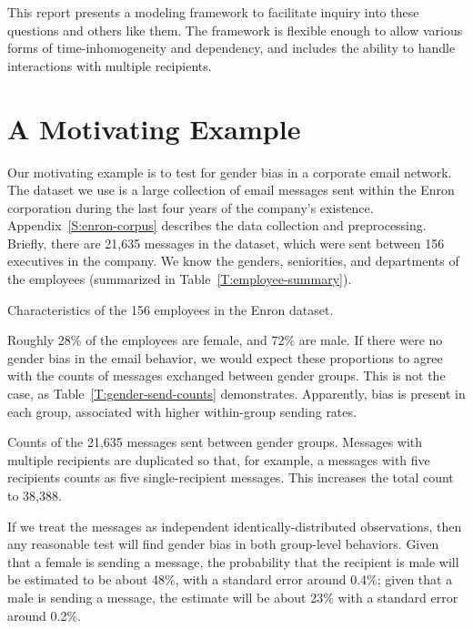 \documentclass[aoas,preprint]{imsart}
\begin{document}
This report presents a modeling framework to facilitate inquiry into
these questions and others like them. The framework is flexible enough to
allow various forms of time-inhomogeneity and dependency, and includes the
ability to handle interactions with multiple recipients. 


\section{A Motivating Example}

Our motivating example is to test for gender bias in a corporate email
network.  The dataset we use is a large collection of email messages sent
within the Enron corporation during the last four years of the company's
existence.  Appendix~\ref{S:enron-corpus} describes the data collection and
preprocessing.  Briefly, there are 21,635 messages in the dataset, which
were sent between 156 executives in the company.  We know the genders,
seniorities, and departments of the employees (summarized in
Table~\ref{T:employee-summary}).

\begin{table}[h]
    
    \caption{
        Characteristics of the 156 employees in the Enron dataset.
    }
    \label{T:employee-summary}
\end{table}

Roughly 28\% of the employees are female, and 72\% are male.  If there were
no gender bias in the email behavior, we would expect these proportions to
agree with the counts of messages exchanged between gender groups.  This
is not the case, as Table~\ref{T:gender-send-counts} demonstrates.  
Apparently, bias is present in each group, associated with higher
within-group sending rates.

\begin{table}[h]
    
    \caption{
        Counts of the 21,635 messages sent between gender groups.  Messages
        with multiple recipients are duplicated so that, for example,
        a messages with five recipients counts as five single-recipient
        messages.  This increases the total count to 38,388.
    }
    \label{T:gender-send-counts}
\end{table}

If we treat the messages as independent identically-distributed observations,
then any reasonable test will find gender bias in both group-level behaviors.
Given that a female is sending a message, the probability that the recipient
is male will be estimated to be about 48\%, with a standard error around
0.4\%; given that a male is sending a message, the estimate will be about
23\% with a standard error around 0.2\%.
\end{document}
